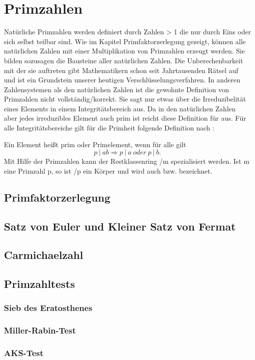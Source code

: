 \section{Primzahlen}
	Natürliche Primzahlen werden definiert durch Zahlen > 1 die nur durch Eins oder sich selbst teilbar sind. Wie im Kapitel Primfaktorzerlegung gezeigt, können alle natürlichen Zahlen mit einer Multiplikation von Primzahlen erzeugt werden. Sie bilden sozusagen die Bausteine aller natürlichen Zahlen. Die Unberechenbarkeit mit der sie auftreten gibt Mathematikern schon seit Jahrtausenden Rätsel auf und ist ein Grundstein unserer heutigen Verschlüsselungsverfahren.
	In anderen Zahlensystemen als den natürlichen Zahlen ist die gewohnte Definition von Primzahlen nicht vollständig/korrekt. Sie sagt nur etwas über die Irreduzibelität eines Elements in einem Integritätsbereich aus. Da in den natürlichen Zahlen aber jedes irreduzibles Element auch prim ist reicht diese Definition für  aus.
	Für alle Integritätsbereiche gilt für die Primheit folgende Definition nach \cite{Algorithmische:Zahlentheorie}:
	
	Ein Element  heißt prim oder Primelement, wenn für alle  gilt	
	\begin{displaymath}
		p~|~ab \Longrightarrow p~|~a~oder~p~|~b.
	\end{displaymath}	
	Mit Hilfe der Primzahlen kann der Restklassenring /m spezialisiert werden. Ist m eine Primzahl p, so ist /p ein Körper und wird auch  bzw.  bezeichnet.

	\subsection{Primfaktorzerlegung}
	\subsection{Satz von Euler und Kleiner Satz von Fermat}
	\subsection{Carmichaelzahl}
	\subsection{Primzahltests}
		\subsubsection{Sieb des Eratosthenes}
		\subsubsection{Miller-Rabin-Test}
		\subsubsection{AKS-Test}